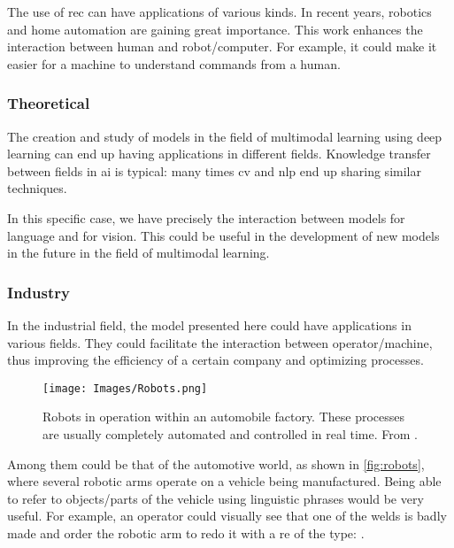 The use of \gls{rec} can have applications of various kinds. In recent years,
robotics and home automation are gaining great importance. This work enhances
the interaction between human and robot/computer. For example, it could make it
easier for a machine to understand commands from a human.

\subsubsection{Theoretical}

The creation and study of models in the field of multimodal
learning using deep learning can end up having
applications in different fields. Knowledge transfer between fields in \gls{ai}
is typical: many times \gls{cv} and \gls{nlp} end up sharing similar
techniques.

In this specific case, we have precisely the interaction between models for
language and for vision. This could be useful in the development of new models
in the future in the field of multimodal learning.

\subsubsection{Industry}

In the industrial field, the model presented here could have applications in
various fields. They could facilitate the interaction between operator/machine,
thus improving the efficiency of a certain company and optimizing processes.

\begin{figure}[ht]
  \centering
  \texttt{[image: Images/Robots.png]}
  \caption[Robots in automobile factory]{Robots in operation within an
    automobile factory. These processes are usually completely automated and
    controlled in real time. From
    .}\label{fig:robots}
\end{figure}

Among them could be that of the automotive world, as shown in
\vref{fig:robots}, where several robotic arms operate on a vehicle being
manufactured. Being able to refer to objects/parts of the vehicle using
linguistic phrases would be very useful. For example, an operator could
visually see that one of the welds is badly made and order the robotic arm to
redo it with a \gls{re} of the type: .


